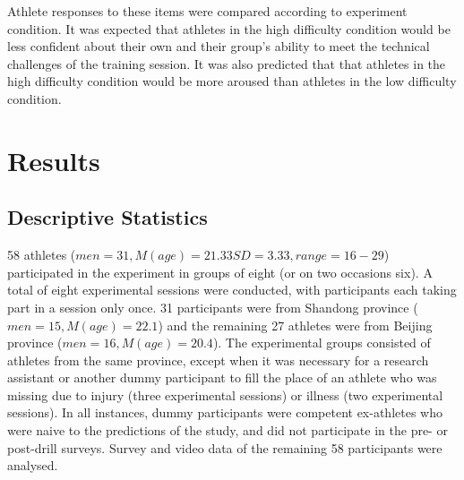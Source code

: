 Athlete responses to these items were compared according to experiment condition. It was expected that athletes in the high difficulty condition would be less confident about their own and their group's ability to meet the technical challenges of the training session.  It was also predicted that that athletes in the high difficulty condition would be more aroused than athletes in the low difficulty condition.


































\clearpage
\section{Results}


\subsection{Descriptive Statistics \label{sec:descriptives}}

58 athletes ($men = 31, M(age) = 21.33 SD = 3.33, range = 16-29$) participated in the experiment in groups of eight (or on two occasions six).  A total of eight experimental sessions were conducted, with participants each taking part in a session only once.  31 participants were from Shandong province ($men = 15, M(age) = 22.1$) and the remaining 27 athletes were from Beijing province ($men = 16, M(age) = 20.4$).  The experimental groups consisted of athletes from the same province, except when it was necessary for a research assistant or another dummy participant to fill the place of an athlete who was missing due to injury (three experimental sessions) or illness (two experimental sessions).  In all instances, dummy participants were competent ex-athletes who were naive to the predictions of the study, and did not participate in the pre- or post-drill surveys. Survey and video data of the remaining 58 participants were analysed.

